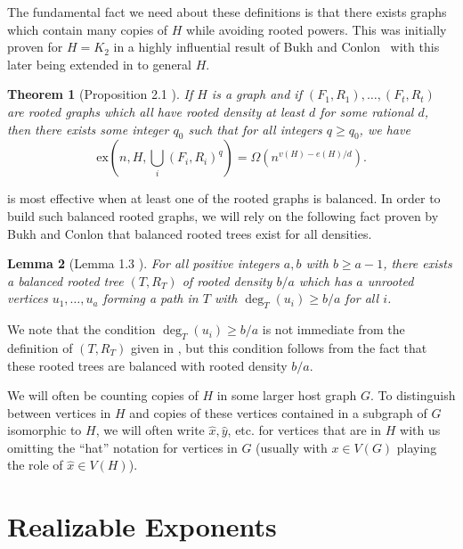 \documentclass[12pt,letterpaper]{article}
\newtheorem{theorem}{Theorem}[section]
\newtheorem{lemma}[theorem]{Lemma}
\theoremstyle{definition}
\newcommand{\pow}{q} %
\newcommand{\ex}{\mathrm{ex}}
\begin{document}
	The fundamental fact we need about these definitions is that there exists graphs which contain many copies of $H$ while avoiding rooted powers.  This was initially proven for $H=K_2$ in a highly influential result of Bukh and Conlon~\cite{BC2018} with this later being extended in \cite{S24} to general $H$.
	
	
	\begin{theorem}[Proposition 2.1 \cite{S24}]\label{theorem random polynomial lower bounds}
		If $H$ is a graph and if $(F_1,R_1),\ldots,(F_t,R_t)$ are rooted graphs which all have rooted density at least $d$ for some rational $d$, then there exists some integer $\pow_0$ such that for all integers $\pow\ge \pow_0$, we have
		\[\ex(n,H,\bigcup_i (F_i,R_i)^\pow)=\Omega(n^{v(H)-e(H)/d}).\]
	\end{theorem}
	
	 is most effective when at least one of the rooted graphs is balanced.  In order to build such balanced rooted graphs, we will rely on the following fact proven by Bukh and Conlon that balanced rooted trees exist for all densities.
	
	\begin{lemma}[Lemma 1.3 \cite{BC2018}]\label{lem:BukhConlon}
		For all positive integers $a,b$ with $b\ge a-1$, there exists a balanced rooted tree $(T,R_T)$ of rooted density $b/a$ which has $a$ unrooted vertices $u_1,\ldots,u_a$ forming a path in $T$ with $\deg_T(u_i)\ge b/a$ for all $i$.
	\end{lemma}
	We note that the condition $\deg_T(u_i)\ge b/a$ is not immediate from the definition of $(T,R_T)$ given in \cite[Definition 1.5]{BC2018}, but this condition follows from the fact that these rooted trees are balanced with rooted density $b/a$.
	
	
	
	We will often be counting copies of $H$ in some larger host graph $G$. To distinguish between vertices in $H$ and copies of these vertices contained in a subgraph of $G$ isomorphic to $H$, we will often write $\hat{x},\hat{y}$, etc. for vertices that are in $H$ with us omitting the ``hat'' notation for vertices in $G$ (usually with $x\in V(G)$ playing the role of $\hat{x}\in V(H)$).
	
	
	
	
	\section{Realizable Exponents}\label{section realizable}
	
\end{document}
